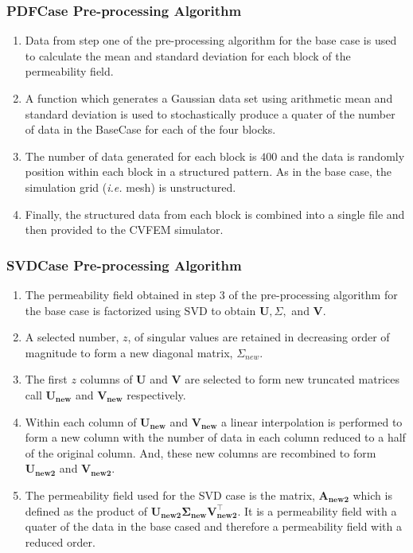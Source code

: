 \documentclass[preprint,12pt]{elsarticle}
\begin{document}
\subsubsection{PDFCase Pre-processing Algorithm}\label{subsubsection:pdfcase_preprocess_algorithm}
\begin{enumerate}[1]
  \item Data from step one of the pre-processing algorithm for the base case is used to calculate the mean and standard deviation for each block of the permeability field.
  \item A function which generates a Gaussian data set using arithmetic mean and standard deviation is used to stochastically produce a quater of the number of data in the BaseCase for each of the four blocks.
  \item The number of data generated for each block is $400$ and the data is randomly position within each block in a structured pattern. As in the base case, the simulation grid ({\it i.e.} mesh) is unstructured.
  \item Finally, the structured data from each block is combined into a single file and then provided to the CVFEM simulator.
\end{enumerate}


\subsubsection{SVDCase Pre-processing Algorithm}\label{subsubsection:svdcase_preprocess_algorithm}
\begin{enumerate}[1]
  \item The permeability field obtained in step 3 of the pre-processing algorithm for the base case is factorized using SVD to obtain $\mathbf{U}, \Sigma,$ and $\mathbf{V}$.
  \item A selected number, $z$, of singular values are retained in decreasing order of magnitude to form a new diagonal matrix, $\Sigma_{new}$.
  \item The first $z$ columns of $\mathbf{U}$ and $\mathbf{V}$ are selected to form new truncated matrices call $\mathbf{U_{new}}$ and $\mathbf{V_{new}}$ respectively.
  \item Within each column of $\mathbf{U_{new}}$ and $\mathbf{V_{new}}$ a linear interpolation is performed to form a new column with the number of data in each column reduced to a half of the original column. And, these new columns are recombined to form $\mathbf{U_{new2}}$ and $\mathbf{V_{new2}}$.
  \item The permeability field used for the SVD case is the matrix, $\mathbf{A_{new2}}$ which is defined as the product of $\mathbf{U_{new2}} \mathbf{\Sigma_{new}} \mathbf{V_{new2}^{\intercal}}$. It is a permeability field with a quater of the data in the base cased and therefore a permeability field with a reduced order.  
\end{enumerate}
\end{document}
